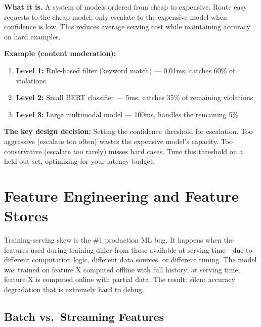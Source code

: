 \textbf{What it is.} A system of models ordered from cheap to expensive. Route easy requests to the cheap model; only escalate to the expensive model when confidence is low. This reduces average serving cost while maintaining accuracy on hard examples.

\textbf{Example (content moderation):}
\begin{enumerate}
    \item \textbf{Level 1:} Rule-based filter (keyword match) --- 0.01ms, catches 60\% of violations
    \item \textbf{Level 2:} Small BERT classifier --- 5ms, catches 35\% of remaining violations
    \item \textbf{Level 3:} Large multimodal model --- 100ms, handles the remaining 5\%
\end{enumerate}

\textbf{The key design decision:} Setting the confidence threshold for escalation. Too aggressive (escalate too often) wastes the expensive model's capacity. Too conservative (escalate too rarely) misses hard cases. Tune this threshold on a held-out set, optimizing for your latency budget.

\section{Feature Engineering and Feature Stores}
\label{sec:feature_stores}

\begin{warningbox}
Training-serving skew is the \#1 production ML bug. It happens when the features used during training differ from those available at serving time---due to different computation logic, different data sources, or different timing. The model was trained on feature X computed offline with full history; at serving time, feature X is computed online with partial data. The result: silent accuracy degradation that is extremely hard to debug.
\end{warningbox}

\subsection{Batch vs.\ Streaming Features}

